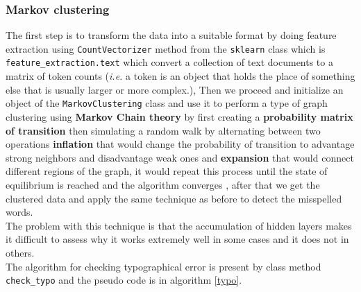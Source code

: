 \documentclass{article}
\begin{document}
\subsubsection{Markov clustering}
The first step is to transform the data into a suitable format by doing feature extraction using \texttt{CountVectorizer} method from the \texttt{sklearn} class which is \texttt{feature\_extraction.text} \cite{vector} which convert a collection of text documents to a matrix of token counts (\textit{i.e.} a token is an object that holds the place of something else that is usually larger or more complex.), Then we proceed and initialize an object of the \texttt{MarkovClustering} class \cite{MarkovClustering} and use it to perform a type of graph clustering using \textbf{Markov Chain theory} by first creating a \textbf{probability matrix of transition} then simulating a random walk by alternating between two operations \textbf{inflation} that would change the probability of transition to advantage strong neighbors and disadvantage weak ones and \textbf{expansion} that would connect different regions of the graph, it would repeat this process until the state of equilibrium is reached and the algorithm converges \cite{explainMCL}, after that we get the clustered data and apply the same technique as before to detect the misspelled words.\\
The problem with this technique is that the accumulation of hidden layers makes it difficult to assess why it works extremely well in some cases and it does not in others.\\

The algorithm for checking typographical error is present by class method \texttt{check\_typo} and the pseudo code is in algorithm \ref{typo}.
\end{document}
